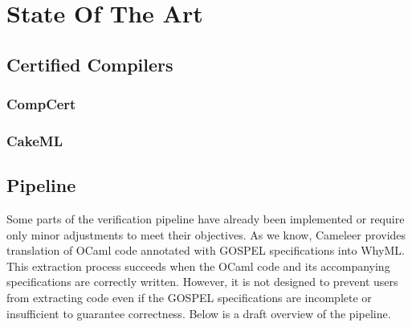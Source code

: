 
%

\chapter{State Of The Art}
\label{cha:State_Of_The_Art}

\section{Certified Compilers}
\label{sec:Certified_Compilers}

\subsection{CompCert}
\label{sec:CompCert}

\subsection{CakeML}
\label{sec:CakeML}



\section{Pipeline}
\label{sec:Pipeline}

Some parts of the verification pipeline have already been implemented or require only minor adjustments to meet their 
objectives. As we know, Cameleer provides translation of OCaml code annotated with GOSPEL specifications into WhyML. 
This extraction process succeeds when the OCaml code and its accompanying specifications are correctly written. However, 
it is not designed to prevent users from extracting code even if the GOSPEL specifications are incomplete or insufficient 
to guarantee correctness. Below is a draft overview of the pipeline.

